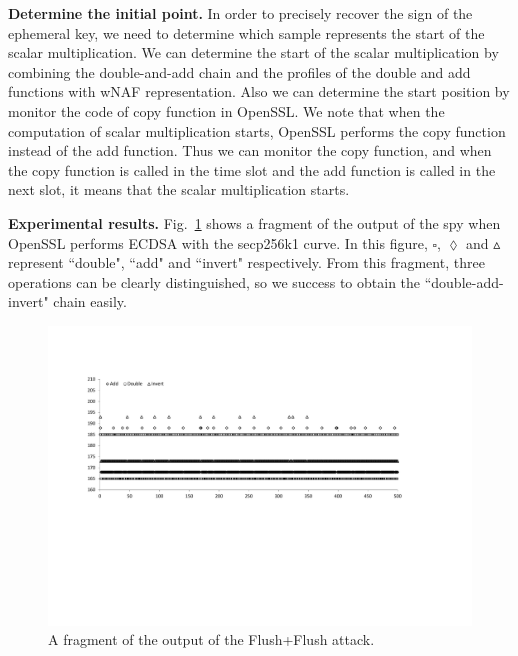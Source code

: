\noindent\textbf{Determine the initial point.}
In order to precisely recover the sign of the ephemeral key, we need to determine which sample represents the start of the scalar multiplication.
We can determine the
start of the scalar multiplication
by combining the double-and-add chain and the profiles of the double and add functions with wNAF representation.
Also we can determine the start position by monitor the code of copy function in OpenSSL.
 We note that when the computation of scalar multiplication starts, OpenSSL performs the copy function instead of the add function.
 Thus we can monitor the copy function, and when the copy function is called in the time slot and the add function is called in the next slot, it means that the scalar multiplication starts.


\noindent\textbf{Experimental results.}
Fig.~\ref{fig1} shows a fragment of the output of the spy when OpenSSL performs ECDSA with the secp256k1 curve.
In this figure, $\square$, $\lozenge$ and $\vartriangle$ represent ``double", ``add" and ``invert" respectively.
From this fragment, three operations can be clearly distinguished,
 so we success to obtain the ``double-add-invert" chain easily.




\begin{figure}
\centering
\includegraphics[width=\textwidth]{pic/slot2500.pdf}
\caption{A fragment of the output of the Flush+Flush attack.} \label{fig1}
\end{figure}


